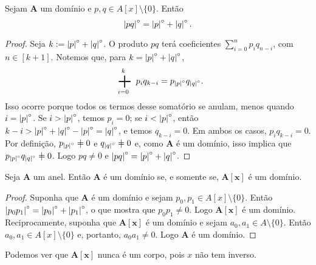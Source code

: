 
\begin{proposition}
Sejam $\bm A$ um domínio e $p,q \in A[x]\setminus\{0\}$. Então
	\begin{equation*}
	\left\vert{pq}\right\vert^{\circ}=\left\vert{p}\right\vert^{\circ}+\left\vert{q}\right\vert^{\circ}.
	\end{equation*}
\end{proposition}
\begin{proof}
Seja $k := \left\vert{p}\right\vert^{\circ}+\left\vert{q}\right\vert^{\circ}$. O produto $pq$ terá coeficientes $\sum_{i=0}^n p_i q_{n-i}$, com $n \in [k+1]$. Notemos que, para $k = \left\vert{p}\right\vert^{\circ}+\left\vert{q}\right\vert^{\circ}$,
	\begin{equation*}
	\sum_{i=0}^k p_i q_{k-i} = p_{\grau{p}}q_{\grau{q}}.
	\end{equation*}
Isso ocorre porque todos os termos desse somatório se anulam, menos quando $i=\left\vert{p}\right\vert^{\circ}$. Se $i>\left\vert{p}\right\vert^{\circ}$, temos $p_i=0$; se $i<\left\vert{p}\right\vert^{\circ}$, então $k-i > \left\vert{p}\right\vert^{\circ}+\left\vert{q}\right\vert^{\circ}-\left\vert{p}\right\vert^{\circ} = \left\vert{q}\right\vert^{\circ}$, e temos $q_{k-i}=0$. Em ambos os casos, $p_i q_{k-i}=0$. Por definição, $p_{\grau{p}} \neq 0$ e $q_{\grau{q}} \neq 0$ e, como $\bm A$ é um domínio, isso implica que $p_{\grau{p}} q_{\grau{q}} \neq 0$. Logo $pq \neq 0$ e $\left\vert{pq}\right\vert^{\circ}=\left\vert{p}\right\vert^{\circ}+\left\vert{q}\right\vert^{\circ}$.
\end{proof}

\begin{proposition}
Seja $\bm A$ um anel. Então $\bm A$ é um domínio se, e somente se, $\bm{A[x]}$ é um domínio.
\end{proposition}
\begin{proof}
Suponha que $\bm A$ é um domínio e sejam $p_0,p_1 \in A[x]\setminus\{0\}$. Então $\left\vert{p_0p_1}\right\vert^{\circ}=\left\vert{p_0}\right\vert^{\circ}+\left\vert{p_1}\right\vert^{\circ}$, o que mostra que $p_0p_1 \neq 0$. Logo $\bm{A[x]}$ é um domínio. Reciprocamente, suponha que $\bm{A[x]}$ é um domínio e sejam $a_0,a_1 \in A\setminus\{0\}$. Então $a_0,a_1 \in A[x]\setminus\{0\}$ e, portanto, $a_0a_1 \neq 0$. Logo $\bm A$ é um domínio.
\end{proof}

Podemos ver que $\bm{A[x]}$ nunca é um corpo, pois $x$ não tem inverso.

